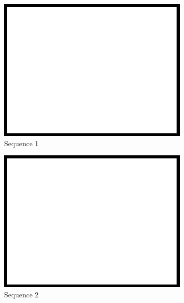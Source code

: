 \begin{figure}
\centering
	\begin{subfigure}{0.49\columnwidth}
    \centering
    \includegraphics[width=1.00\textwidth]{media/dummy.jpg}
    \caption{Sequence 1}
		\label{fig:datasets_1}
  \end{subfigure}
	\begin{subfigure}{0.49\columnwidth}
    \centering
    \includegraphics[width=1.00\textwidth]{media/dummy.jpg}
		\caption{Sequence 2}
		\label{fig:datasets_2}
  \end{subfigure} \vspace{10pt} \\ 
	\begin{subfigure}{0.49\columnwidth}

\end{subfigure}
\end{figure}
